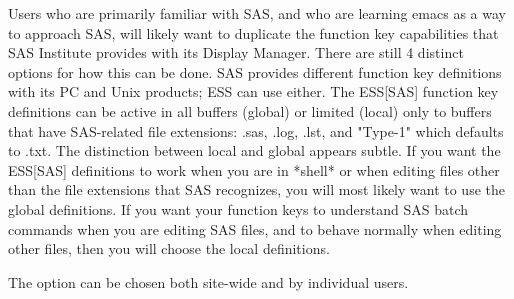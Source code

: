 \documentclass{article}
\begin{document}
Users who are primarily familiar with SAS, and who are learning emacs
as a way to approach SAS, will likely want to duplicate the function
key capabilities that SAS Institute provides with its Display Manager.
There are still 4 distinct options for how this can be done.  SAS
provides different function key definitions with its PC and Unix
products; ESS can use either.  The ESS[SAS] function key definitions
can be active in all buffers (global) or limited (local) only to
buffers that have SAS-related file extensions: .sas, .log, .lst, and
"Type-1" which defaults to .txt.  The distinction between local and
global appears subtle.  If you want the ESS[SAS] definitions to work
when you are in *shell* or when editing files other than the file
extensions that SAS recognizes, you will most likely want to use the
global definitions.  If you want your function keys to understand SAS
batch commands when you are editing SAS files, and to behave normally
when editing other files, then you will choose the local definitions.

The option can be chosen both site-wide and by individual users.


\end{document}
